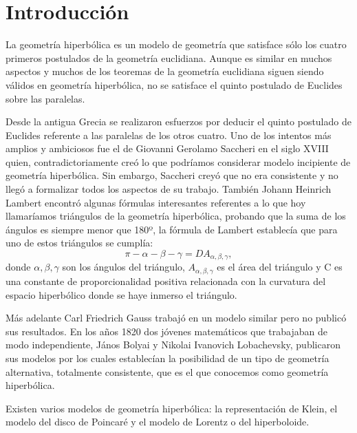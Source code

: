 \documentclass{article}
\theoremstyle{plain}
\theoremstyle{definition}
\theoremstyle{remark}
\begin{document}
\maketitle

\newpage
\tableofcontents
\newpage

\section{Introducción}

La geometría hiperbólica es un modelo de geometría que satisface sólo
los cuatro primeros postulados de la geometría euclidiana. Aunque es
similar en muchos aspectos y muchos de los teoremas de la geometría
euclidiana siguen siendo válidos en geometría hiperbólica, no se
satisface el quinto postulado de Euclides sobre las paralelas.

Desde la antigua Grecia se realizaron esfuerzos por deducir el quinto
postulado de Euclides referente a las paralelas de los otros
cuatro. Uno de los intentos más amplios y ambiciosos fue el de
Giovanni Gerolamo Saccheri en el siglo XVIII quien,
contradictoriamente creó lo que podríamos considerar modelo incipiente
de geometría hiperbólica. Sin embargo, Saccheri creyó que no era
consistente y no llegó a formalizar todos los aspectos de su
trabajo. También Johann Heinrich Lambert encontró algunas fórmulas
interesantes referentes a lo que hoy llamaríamos triángulos de la
geometría hiperbólica, probando que la suma de los ángulos es siempre
menor que 180º, la fórmula de Lambert establecía que para uno de estos
triángulos se
cumplía: $$\pi-\alpha-\beta-\gamma=DA_{\alpha,\beta,\gamma},$$ donde
$\alpha,\beta,\gamma$ son los ángulos del triángulo,
$A_{\alpha,\beta,\gamma}$ es el área del triángulo y C es una
constante de proporcionalidad positiva relacionada con la curvatura
del espacio hiperbólico donde se haye inmerso el triángulo.

Más adelante Carl Friedrich Gauss trabajó en un modelo similar pero no
publicó sus resultados. En los años 1820 dos jóvenes matemáticos que
trabajaban de modo independiente, János Bolyai y Nikolai Ivanovich
Lobachevsky, publicaron sus modelos por los cuales establecían la
posibilidad de un tipo de geometría alternativa, totalmente
consistente, que es el que conocemos como geometría hiperbólica.

Existen varios modelos de geometría hiperbólica: la representación de
Klein, el modelo del disco de Poincaré y el modelo de Lorentz o del
hiperboloide.
\end{document}
